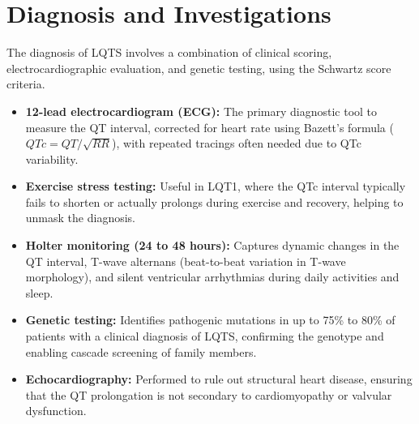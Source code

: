 \section*{Diagnosis and Investigations}
The diagnosis of LQTS involves a combination of clinical scoring, electrocardiographic evaluation, and genetic testing, using the Schwartz score criteria.
\begin{itemize}
    \item \textbf{12-lead electrocardiogram (ECG):} The primary diagnostic tool to measure the QT interval, corrected for heart rate using Bazett's formula ($QTc = QT/\sqrt{RR}$), with repeated tracings often needed due to QTc variability.
    \item \textbf{Exercise stress testing:} Useful in LQT1, where the QTc interval typically fails to shorten or actually prolongs during exercise and recovery, helping to unmask the diagnosis.
    \item \textbf{Holter monitoring (24 to 48 hours):} Captures dynamic changes in the QT interval, T-wave alternans (beat-to-beat variation in T-wave morphology), and silent ventricular arrhythmias during daily activities and sleep.
    \item \textbf{Genetic testing:} Identifies pathogenic mutations in up to 75\% to 80\% of patients with a clinical diagnosis of LQTS, confirming the genotype and enabling cascade screening of family members.
    \item \textbf{Echocardiography:} Performed to rule out structural heart disease, ensuring that the QT prolongation is not secondary to cardiomyopathy or valvular dysfunction.
\end{itemize}

